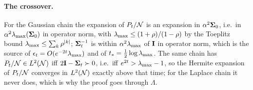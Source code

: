 \paragraph{The crossover.}
For the Gaussian chain the expansion of $P_t/\mathcal{N}$ is an expansion in $\alpha^2\mathbf{\Sigma}_0$,
i.e.\ in $\alpha^2\lambda_{\max}(\mathbf{\Sigma}_0)$ in operator norm, with $\lambda_{\max}\le(1+\rho)/(1-\rho)$ by
the Toeplitz bound $\lambda_{\max}\le\sum_k\rho^{|k|}$; $\mathbf{\Sigma}_t^{-1}$ is within $\alpha^2\lambda_{\max}$
of $\mathbf{I}$ in operator norm, which is the source of $\epsilon_t=O(e^{-2t}\lambda_{\max})$ and of
$t_\ast=\tfrac12\log\lambda_{\max}$. The same chain has $P_t/\mathcal{N}\in L^2(\mathcal{N})$ iff
$2\mathbf{I}-\mathbf{\Sigma}_t\succ0$, i.e.\ iff $e^{2t}>\lambda_{\max}-1$, so the Hermite expansion of $P_t/\mathcal{N}$
converges in $L^2(\mathcal{N})$ exactly above that time; for the Laplace chain it never does,
which is why the proof goes through $\Lambda$.
